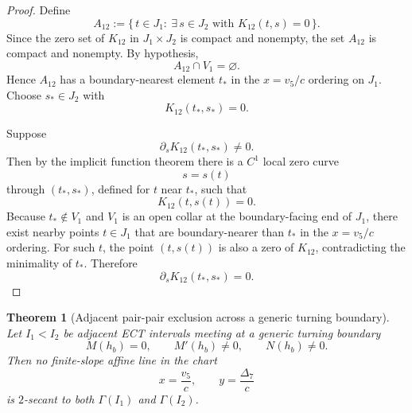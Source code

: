 \documentclass[11pt,a4paper]{amsart}
\theoremstyle{plain}
\newtheorem{theorem}{Theorem}[section]
\theoremstyle{definition}
\begin{document}
\begin{proof}
Define
\[
A_{12}:=\{\,t\in J_1:\ \exists\, s\in J_2 \text{ with } K_{12}(t,s)=0\,\}.
\]
Since the zero set of $K_{12}$ in $J_1\times J_2$ is compact and nonempty,
the set $A_{12}$ is compact and nonempty. By hypothesis,
\[
A_{12}\cap V_1=\varnothing.
\]
Hence $A_{12}$ has a boundary-nearest element $t_*$ in the $x=v_5/c$
ordering on $J_1$. Choose $s_*\in J_2$ with
\[
K_{12}(t_*,s_*)=0.
\]

Suppose
\[
\partial_s K_{12}(t_*,s_*)\neq 0.
\]
Then by the implicit function theorem there is a $C^1$ local zero curve
\[
s=s(t)
\]
through $(t_*,s_*)$, defined for $t$ near $t_*$, such that
\[
K_{12}(t,s(t))=0.
\]
Because $t_*\notin V_1$ and $V_1$ is an open collar at the boundary-facing
end of $J_1$, there exist nearby points $t\in J_1$ that are boundary-nearer
than $t_*$ in the $x=v_5/c$ ordering. For such $t$, the point
$(t,s(t))$ is also a zero of $K_{12}$, contradicting the minimality of
$t_*$. Therefore
\[
\partial_s K_{12}(t_*,s_*)=0.
\]
\end{proof}

\begin{theorem}[Adjacent pair-pair exclusion across a generic turning boundary]
\label{thm:adjacent-pair-pair-exclusion-turning}
Let $I_1<I_2$ be adjacent ECT intervals meeting at a generic turning boundary
\[
M(h_b)=0,\qquad M'(h_b)\neq 0,\qquad N(h_b)\neq 0.
\]
Then no finite-slope affine line in the chart
\[
x=\frac{v_5}{c},
\qquad
y=\frac{\Delta_7}{c}
\]
is $2$-secant to both $\Gamma(I_1)$ and $\Gamma(I_2)$.
\end{theorem}
\end{document}

